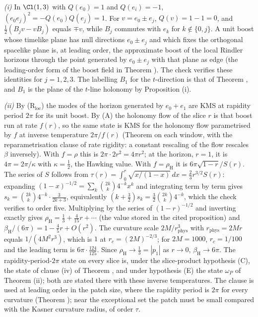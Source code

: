 \emph{(i)} In $\Cl(1,3)$ with $Q(e_{0}) = 1$ and $Q(e_{i}) = -1$, $(e_{0}e_{j})^{2} = -Q(e_{0})Q(e_{j}) = 1$. For $v = e_{0} \pm e_{j}$, $Q(v) = 1 - 1 = 0$, and $\tfrac12(B_{j}v - vB_{j})$ equals $\mp v$, while $B_{j}$ commutes with $e_{k}$ for $k \notin \{0, j\}$. A unit boost whose timelike plane has null directions $e_{0} \pm e_{j}$ and which fixes the orthogonal spacelike plane is, at leading order, the approximate boost of the local Rindler horizons through the point generated by $e_{0} \pm e_{j}$ with that plane as edge (the leading-order form of the boost field in Theorem ). The check verifies these identities for $j = 1, 2, 3$. The labelling $B_{1}$ for the $t$-direction is that of Theorem , and $B_{1}$ is the plane of the $t$-line holonomy by Proposition (i).

\emph{(ii)} By (R$_{\mathrm{loc}}$) the modes of the horizon generated by $e_{0} + e_{1}$ are KMS at rapidity period $2\pi$ for its unit boost. By (A) the holonomy flow of the slice $r$ is that boost run at rate $f(r)$, so the same state is KMS for the holonomy flow parametrised by $f$ at inverse temperature $2\pi/f(r)$ (Theorem  on each window, with the reparametrisation clause of rate rigidity: a constant rescaling of the flow rescales $\beta$ inversely). With $f = \rho$ this is $2\pi \cdot 2r^{2} = 4\pi r^{2}$; at the horizon, $r = 1$, it is $4\pi = 2\pi/\kappa$ with $\kappa = \tfrac12$, the Hawking value. With $f = \rho_{\mathrm{H}}$ it is $6\pi\sqrt{1 - r}/S(r)$. The series of $S$ follows from $\tau(r) = \int_{0}^{r}\sqrt{x/(1 - x)}\,dx = \tfrac23 r^{3/2}S(r)$: expanding $(1 - x)^{-1/2} = \sum_{k}\binom{2k}{k}4^{-k}x^{k}$ and integrating term by term gives $s_{k} = \binom{2k}{k}4^{-k}\cdot\tfrac{3}{2k + 3}$, equivalently $(k + \tfrac32)s_{k} = \tfrac32\binom{2k}{k}4^{-k}$, which the check verifies to order five. Multiplying by the series of $(1 - r)^{-1/2}$ and inverting exactly gives $\rho_{\mathrm{H}} = \tfrac13 + \tfrac{4}{15}r + \cdots$ (the value stored in the cited proposition) and $\beta_{\mathrm{H}}/(6\pi) = 1 - \tfrac45 r + O(r^{2})$. The curvature scale $2M/r_{\mathrm{phys}}^{3}$ with $r_{\mathrm{phys}} = 2Mr$ equals $1/(4M^{2}r^{3})$, which is $1$ at $r_{c} = (2M)^{-2/3}$; for $2M = 1000$, $r_{c} = 1/100$ and the leading term is $6\pi \cdot \tfrac{124}{125}$. Since $\rho_{\mathrm{H}} \to \tfrac13 = |p_{1}|$ as $r \to 0$, $\beta_{\mathrm{H}} \to 6\pi$. The rapidity-period-$2\pi$ state on every slice is, under the slice-product hypothesis (C), the state of clause (iv) of Theorem , and under hypothesis (E) the state $\omega_{P}$ of Theorem (ii); both are stated there with these inverse temperatures. The clause is used at leading order in the patch size, where the rapidity period is $2\pi$ for every curvature (Theorem ); near the exceptional set the patch must be small compared with the Kasner curvature radius, of order $\tau$.

